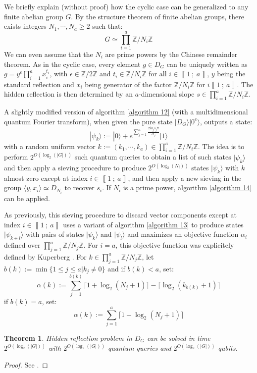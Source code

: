 \documentclass[a4paper,10pt]{report}
\theoremstyle{definition}
\theoremstyle{plain}
\newtheorem{theorem}[definition]{Theorem}
\theoremstyle{definition}
\newcommand{\Z}{\mathbb{Z}}
\renewcommand{\i}[2]{\left\llbracket #1~;~#2\right\rrbracket}
\renewcommand{\(}{\left(}
\renewcommand{\)}{\right)}
\begin{document}
We briefly explain (without proof) how the cyclic case can be generalized to any finite abelian group $G$. By the structure theorem of finite abelian groups, there exists integers $N_1,\cdots,N_a\geq 2$ such that:
\[G\simeq\prod_{i=1}^a \Z/N_i\Z\]
We can even assume that the $N_i$ are prime powers by the Chinese remainder theorem. As in the cyclic case, every element $g\in D_G$ can be uniquely written as $g=y^\epsilon \prod_{i=1}^a x_i^{t_i}$, with $\epsilon\in\Z/2\Z$ and $t_i\in\Z/N_i\Z$ for all $i\in\i{1}{a}$, $y$ being the standard reflection and $x_i$ being generator of the factor $\Z/N_i\Z$ for $i\i{1}{a}$. The hidden reflection is then determined by an $a$-dimensional slope $s\in\prod_{i=1}^a \Z/N_i\Z$.

A slightly modified version of algorithm \ref{algorithm 12} (with a multidimensional quantum Fourier transform), when given the pure state $|D_G\rangle|0^e\rangle$, outputs a state:
\[|\psi_k\rangle:=|0\rangle +e^{\sum_{j=1}^a \frac{2ik_js_j\pi}{N_j}}|1\rangle\]
with a random uniform vector $k:=(k_1, \cdots, k_a)\in\prod_{i=1}^a \Z/N_i\Z$. The idea is to perform $2^{O(\log_2(|G|))}$ such quantum queries to obtain a list of such states $|\psi_k\rangle$ and then apply a sieving procedure to produce $2^{O(\log_2(N_i))}$ states $|\psi_k\rangle$ with $k$ almost zero except at index $i\in\i{1}{a}$, and then apply a new sieving in the group $\langle y, x_i\rangle\simeq D_{N_i}$ to recover $s_i$.  If $N_i$ is a prime power, algorithm \ref{algorithm 14} can be applied.

As previously, this sieving procedure to discard vector components except at index $i\in\i{1}{a}$ uses a variant of algorithm \ref{algorithm 13} to produce states $|\psi_{k\pm l}\rangle$ with pairs of states $|\psi_k\rangle$ and $|\psi_l\rangle$ and maximizes an objective function $\alpha_i$ defined over $\prod_{j=1}^a \Z/N_j\Z$. For $i=a$, this objective function was explicitely defined by Kuperberg \cite[proof of theorem 7.1]{Kuperberg}. For $k\in\prod_{j=1}^a \Z/N_j\Z$, let $b(k):=\min\{1\leq j\leq a| k_j\neq 0\}$ and if $b(k)<a$, set:
\[\alpha(k):=\sum_{j=1}^{b(k)}\lceil 1+\log_2(N_j+1)\rceil -\lceil\log_2(k_{b(k)}+1)\rceil\]
if $b(k)=a$, set:
\[\alpha(k):=\sum_{j=1}^{a}\lceil 1+\log_2(N_j+1)\rceil\]

\begin{theorem}
Hidden reflection problem in $D_G$ can be solved in time $2^{O(\log_2(|G|))}$ with $2^{O(\log_2(|G|))}$ quantum queries and $2^{O(\log_2(|G|))}$ qubits.
\end{theorem}

\begin{proof}
See \cite[theorem 7.1]{Kuperberg}.
\end{proof}
\end{document}
